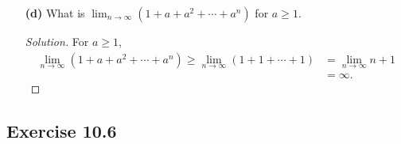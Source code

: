 \documentclass{article}
\begin{document}
\begin{enumerate}
    \item[\textbf{(d)}]
    What is $\lim_{n\to\infty}(1+a+a^2+\cdots+a^n)$ for $a\ge 1$.
    \begin{proof}[Solution]
        For $a\ge 1$,
        \begin{align*}
            \lim_{n\to\infty}(1+a+a^2+\cdots+a^n) \ge \lim_{n\to\infty}(1+1+\cdots+1) 
            & = \lim_{n\to\infty} n+1 \\
            & = \infty.
        \end{align*}
    \end{proof}
\end{enumerate}

\newpage
\subsection*{Exercise 10.6}
\end{document}
